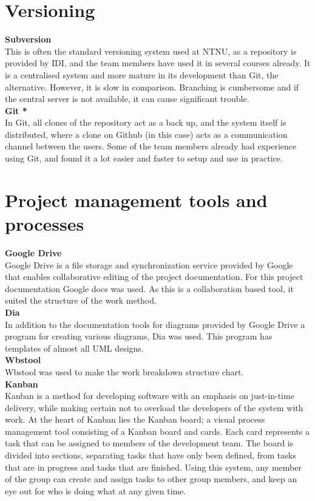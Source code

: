 \section{Versioning}
\textbf{Subversion}\\
This is often the standard versioning system used at NTNU, as a repository is provided by IDI, and the team members have used it in several courses already. It is a centralised system and more mature in its development than Git, the alternative. However, it is slow in comparison. Branching is cumbersome and if the central server is not available, it can cause significant trouble.
\\ \newline
\textbf{Git  *}\\
In Git, all clones of the repository act as a back up, and the system itself is distributed, where a clone on Github (in this case) acts as a communication channel between the users. Some of the team members already had experience using Git, and found it a lot easier and faster to setup and use in practice.


\section{Project management tools and processes}
\textbf{Google Drive}\\
Google Drive is a file storage and synchronization service provided by Google that enables collaborative editing of the project documentation. For this project documentation Google docs was used. As this is a collaboration based tool, it suited the structure of the work method. 
\\ \newline
\textbf{Dia}\\
In addition to the documentation tools for diagrams provided by Google Drive a program for creating various diagrams, Dia was used. This program has templates of almost all UML designs. 
\\ \newline
\textbf{Wbstool}\\
Wbstool was used to make the work breakdown structure chart. 
\\ \newline
\textbf{Kanban}\\
Kanban is a method for developing software with an emphasis on just-in-time delivery, while making certain not to overload the developers of the system with work. At the heart of Kanban lies the Kanban board; a visual process management tool consisting of a Kanban board and cards. Each card represents a task that can be assigned to members of the development team. The board is divided into sections, separating tasks that have only been defined, from tasks that are in progress and tasks that are finished. Using this system, any member of the group can create and assign tasks to other group members, and keep an eye out for who is doing what at any given time.


